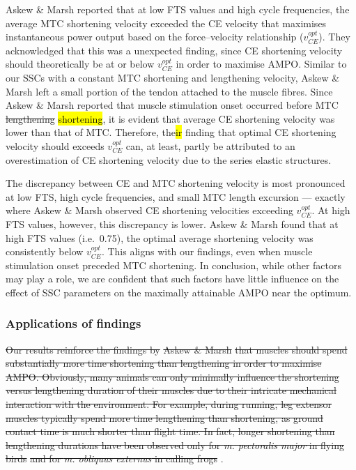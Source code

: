 \documentclass[
  10pt,
  letterpaper,
]{article}
\begin{document}
{Askew \& Marsh \citep{askew_optimal_1998}} reported that at low FTS
values and high cycle frequencies, the average MTC shortening velocity
exceeded the CE velocity that maximises instantaneous power output based
on the force--velocity relationship (\(v_{CE}^{opt}\)). They
acknowledged that this was a unexpected finding, since CE shortening
velocity should theoretically be at or below \(v_{CE}^{opt}\) in order
to maximise AMPO. Similar to our SSCs with a constant MTC shortening and
lengthening velocity, {Askew \& Marsh \citep{askew_optimal_1998}} left a
small portion of the tendon attached to the muscle fibres. Since Askew
\& Marsh reported that muscle stimulation onset occurred before MTC
\st{lengthening} \hl{shortening}, it is evident that average CE
shortening velocity was lower than that of MTC. Therefore, the\hl{ir}
finding that optimal CE shortening velocity should exceeds
\(v_{CE}^{opt}\) can, at least, partly be attributed to an
overestimation of CE shortening velocity due to the series elastic
structures.

The discrepancy between CE and MTC shortening velocity is most
pronounced at low FTS, high cycle frequencies, and small MTC length
excursion --- exactly where {Askew \& Marsh \citep{askew_optimal_1998}}
observed CE shortening velocities exceeding \(v_{CE}^{opt}\). At high
FTS values, however, this discrepancy is lower. {Askew \& Marsh
\citep{askew_optimal_1998}} found that at high FTS values (i.e.~0.75),
the optimal average shortening velocity was consistently below
\(v_{CE}^{opt}\). This aligns with our findings, even when muscle
stimulation onset preceded MTC shortening. In conclusion, while other
factors may play a role, we are confident that such factors have little
influence on the effect of SSC parameters on the maximally attainable
AMPO near the optimum.

\subsubsection{Applications of findings}\label{applications-of-findings}

\st{Our results reinforce the findings by} {\st{Askew \& Marsh}
\citep{askew_effects_1997}} \st{that muscles should spend substantially
more time shortening than lengthening in order to maximise AMPO.
Obviously, many animals can only minimally influence the shortening
versus lengthening duration of their muscles due to their intricate
mechanical interaction with the environment. For example, during
running, leg extensor muscles typically spend more time lengthening than
shortening, as ground contact time is much shorter than flight time. In
fact, longer shortening than lengthening durations have been observed
only for \emph{m. pectoralis major} in flying birds}
\citep[e.g.][]{askew_mechanical_2001, biewener_vivo_1998, earls_kinematics_2000, ellerby_modulation_2007, jackson_scaling_2011, spedding_wake_1987, williamson_pectoralis_2001}
\st{and for \emph{m. obliquus externus} in calling frogs}
\citep{girgenrath_vivo_1997}.
\end{document}
